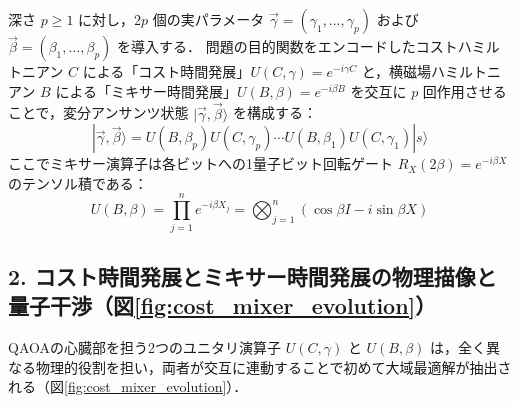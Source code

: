\documentclass[11pt,a4paper,oneside,openany]{ltjsbook}
\theoremstyle{definition}
\theoremstyle{plain}
\theoremstyle{remark}
\newcommand{\ket}[1]{|#1\rangle}
\begin{document}
深さ $p \ge 1$ に対し，$2p$ 個の実パラメータ $\vec{\gamma} = (\gamma_1, \dots, \gamma_p)$ および $\vec{\beta} = (\beta_1, \dots, \beta_p)$ を導入する．
問題の目的関数をエンコードしたコストハミルトニアン $C$ による「コスト時間発展」$U(C, \gamma) = e^{-i \gamma C}$ と，横磁場ハミルトニアン $B$ による「ミキサー時間発展」$U(B, \beta) = e^{-i \beta B}$ を交互に $p$ 回作用させることで，変分アンサンツ状態 $\ket{\vec{\gamma}, \vec{\beta}}$ を構成する：
\begin{equation}
    \ket{\vec{\gamma}, \vec{\beta}} = U(B, \beta_p) U(C, \gamma_p) \cdots U(B, \beta_1) U(C, \gamma_1) \ket{s}
\end{equation}
ここでミキサー演算子は各ビットへの1量子ビット回転ゲート $R_X(2\beta) = e^{-i \beta X}$ のテンソル積である：
\begin{equation}
    U(B, \beta) = \prod_{j=1}^n e^{-i \beta X_j} = \bigotimes_{j=1}^n (\cos\beta I - i \sin\beta X)
\end{equation}

\subsection{2. コスト時間発展とミキサー時間発展の物理描像と量子干渉（図\ref{fig:cost_mixer_evolution}）}
QAOAの心臓部を担う2つのユニタリ演算子 $U(C, \gamma)$ と $U(B, \beta)$ は，全く異なる物理的役割を担い，両者が交互に連動することで初めて大域最適解が抽出される（図\ref{fig:cost_mixer_evolution}）．
\end{document}
